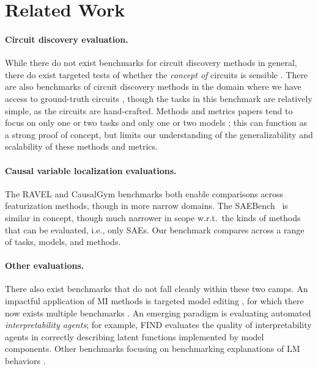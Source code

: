\documentclass{article}
\theoremstyle{plain}
\theoremstyle{definition}
\theoremstyle{remark}
\begin{document}
\section{Related Work}
\paragraph{Circuit discovery evaluation.} While there do not exist benchmarks for circuit discovery methods in general, there do exist targeted tests of whether the \emph{concept of} circuits is sensible \citep{shi2024hypothesis}. There are also benchmarks of circuit discovery methods in the domain where we have access to ground-truth circuits \citep{gupta2024interpbench}, though the tasks in this benchmark are relatively simple, as the circuits are hand-crafted. Methods and metrics papers tend to focus on only one or two tasks and only one or two models \citep{miller2024transformer,ferrando-voita-2024-information,conmy2023towards}; this can function as a strong proof of concept, but limits our understanding of the generalizability and scalability of these methods and metrics.

\paragraph{Causal variable localization evaluations.} The RAVEL \cite{huang-etal-2024-ravel} and CausalGym benchmarks \cite{arora2024} both enable comparisons across featurization methods, though in more narrow domains. The SAEBench~\cite{saebench} is similar in concept, though much narrower in scope w.r.t.\ the kinds of methods that can be evaluated, i.e., only SAEs. Our benchmark compares across a range of tasks, models, and methods.

\paragraph{Other evaluations.} There also exist benchmarks that do not fall cleanly within these two camps. An impactful application of MI methods is targeted model editing \citep{meng2022locating}, for which there now exists multiple benchmarks \citep{cohen-etal-2024-evaluating,abraham2022cebab,zhong-etal-2023-mquake}. An emerging paradigm is evaluating automated \emph{interpretability agents}; for example, FIND \citep{Schwettmann2023} evaluates the quality of interpretability agents in correctly describing latent functions implemented by model components. Other benchmarks focusing on benchmarking explanations of LM behaviors \citep{mills2023almanacs,atanasova-etal-2023-faithfulness}.
\end{document}
